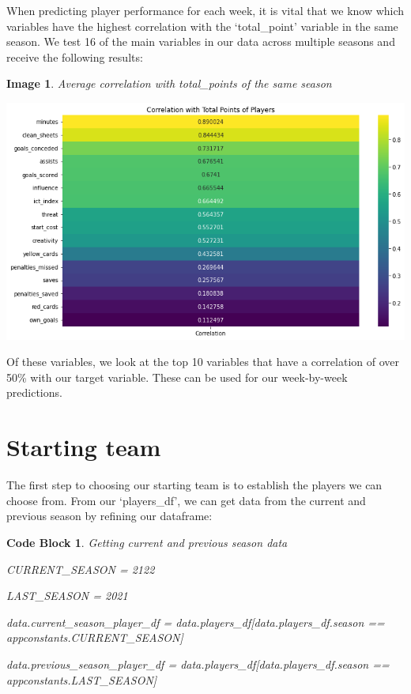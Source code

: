 \documentclass[12pt, a4paper, oneside]{book}
\newtheorem{image}[theorem]{Image}
\newtheorem{codeblock}[theorem]{Code Block}
\numberwithin{equation}{section}
\begin{document}
\vspace{0.5cm}

When predicting player performance for each week, it is vital that we know which variables have the highest correlation with the `total\_point' variable in the same season. We test 16 of the main variables in our data across multiple seasons and receive the following results:

\begin{image} \label{total points current correlation}
  Average correlation with total\_points of the same season

  \vspace{1cm}

  \centerline{\includegraphics[width=1\textwidth]{images/prediction/pre-analysis/total-points-correlation.png}}
\end{image}

Of these variables, we look at the top 10 variables that have a correlation of over 50\% with our target variable. These can be used for our week-by-week predictions.

\section{Starting team}\label{sec:5.1}

The first step to choosing our starting team is to establish the players we can choose from. From our `players\_df', we can get data from the current and previous season by refining our dataframe:

\begin{codeblock}
  Getting current and previous season data

  CURRENT\_SEASON = 2122
  
  LAST\_SEASON = 2021

  data.current\_season\_player\_df = data.players\_df[data.players\_df.season == appconstants.CURRENT\_SEASON] 
  
  data.previous\_season\_player\_df = data.players\_df[data.players\_df.season == appconstants.LAST\_SEASON]
\end{codeblock}
\end{document}
